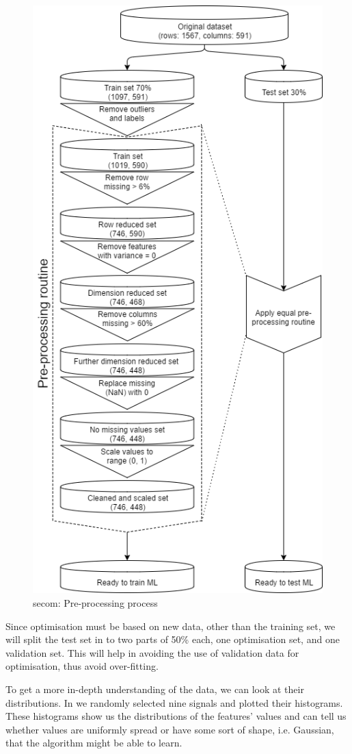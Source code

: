 \documentclass[english, a4paper]{report}
\begin{document}
{{{{                \begin{figure}[H]
                    \centering \includegraphics[width=.45\textwidth]{anom-secom-pre-process}
                    \caption{\gls{secom}: Pre-processing process}
                    \label{fig:secomPreProcessing}
                \end{figure}
                
                Since optimisation must be based on new data, other than the training set, we will split the test set in to two parts of 50\% each, one optimisation set, and one validation set. This will help in avoiding the use of validation data for optimisation, thus avoid over-fitting. 
                \par
                To get a more in-depth understanding of the data, we can look at their distributions. In  we randomly selected nine signals and plotted their histograms. These histograms show us the distributions of the features' values and can tell us whether values are uniformly spread or have some sort of shape, i.e. Gaussian, that the algorithm might be able to learn. 
                        
}}}}
\end{document}

